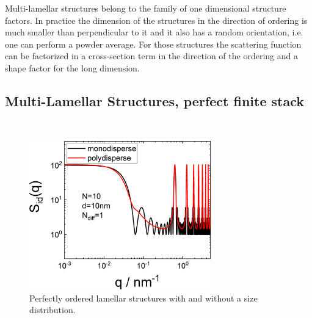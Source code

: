 Multi-lamellar structures belong to the family of one dimensional structure factors. In practice the dimension of the structures in the direction of ordering is much smaller than perpendicular to it and it also has a random orientation, i.e. one can perform a powder average. For those structures the scattering function can be factorized \cite{Porod1948,Hosemann1962,Guinier1963,Zhang1994,Lemmich1996,Pabst2000,Pabst2003,Fruhwirth2004} in a cross-section term in the direction of the ordering and a shape factor for the long dimension.

\subsection{Multi-Lamellar Structures, perfect finite stack} \hspace{1pt}\\

\begin{figure}[htb]
\begin{center}
\includegraphics[width=0.7\textwidth]{../images/structure_factor/Lamellar/IDLamellar.png}
\end{center}
\caption{Perfectly ordered lamellar structures with and without a size distribution.}
\label{fig:PerfectOrderSQ}
\end{figure}

